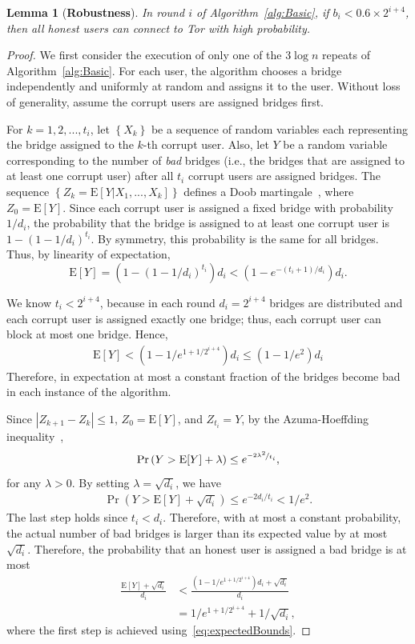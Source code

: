 \documentclass[letterpaper,twocolumn,10pt]{article}
\newcommand{\ie}{i.e.}
\newcommand{\E}{\mathbf{\mathrm{E}}}
\newtheorem{lemma}{Lemma}
\newcommand{\sfsize}{\fontsize{0.73\baselineskip}{0.73\baselineskip}\selectfont}
\newcommand{\sans}[1]{\textsf{\sfsize \mbox{#1}}}
\newcommand{\sansb}[1]{\textbf{\sans{\mbox{#1}}}}
\begin{document}
\begin{lemma}[\sansb{Robustness}] \label{lem:robustness}
	In round $i$ of Algorithm~\ref{alg:Basic}, if ${b_i < 0.6 \times 2^{i+4}}$, then all honest users can connect to Tor with high probability.
\end{lemma}
\begin{proof}
	We first consider the execution of only one of the $3\log{n}$ repeats of Algorithm~\ref{alg:Basic}. For each user, the algorithm chooses a bridge independently and uniformly at random and assigns it to the user. Without loss of generality, assume the corrupt users are assigned bridges first.
	
	For ${k=1,2,...,t_i}$, let $\left\{X_k\right\}$ be a sequence of random variables each representing the bridge assigned to the $k$-th corrupt user. Also, let $Y$ be a random variable corresponding to the number of \emph{bad} bridges (\ie, the bridges that are assigned to at least one corrupt user) after all $t_i$ corrupt users are assigned bridges. The sequence ${\left\{Z_k = \E[Y|X_1,...,X_k]\right\}}$ defines a Doob martingale~\cite[Chapter~5]{dubhashi:2009}, where ${Z_0 = \E[Y]}$. 
	Since each corrupt user is assigned a fixed bridge with probability $1/d_i$, the probability that the bridge is assigned to at least one corrupt user is ${1-(1-1/d_i)^{t_i}}$. By symmetry, this probability is the same for all bridges. Thus, by linearity of expectation,
	\[\E[Y] = \left(1 - \left(1-1/d_i\right)^{t_i}\right)d_i < (1 - e^{-(t_i+1)/d_i})d_i.\]
	
	We know ${t_i < 2^{i+4}}$, because in each round ${d_i = 2^{i+4}}$ bridges are distributed and each corrupt user is assigned exactly one bridge; thus, each corrupt user can block at most one bridge. Hence, 
	\begin{align}
	\E[Y] < (1 - 1/e^{1+1/2^{i+4}})d_i \leq (1 - 1/e^2)d_i \label{eq:expectedBounds}
	\end{align}
	Therefore, in expectation at most a constant fraction of the bridges become bad in each instance of the algorithm. 
	
	Since ${|Z_{k+1} - Z_k| \leq 1}$, ${Z_0 = \E[Y]}$, and ${Z_{t_i} = Y}$, by the Azuma-Hoeffding inequality~\cite[Theorem 5.2]{dubhashi:2009},
	\[\Pr\left(Y > \E[Y] + \lambda\right) \leq e^{\nicefrac{-2\lambda^2}{t_i}},\]
	for any ${\lambda > 0}$. 
	By setting ${\lambda = \sqrt{d_i}}$, we have
	\begin{align}
	\Pr(Y > \E[Y] + \sqrt{d_i}) \leq e^{-2d_i/t_i} < 1/e^2. \label{eq:p1}
	\end{align}
	The last step holds since ${t_i < d_i}$. Therefore, with at most a constant probability, the actual number of bad bridges is larger than its expected value by at most $\sqrt{d_i}$. Therefore, the probability that an honest user is assigned a bad bridge is at most
	\begin{align}
	\frac{\E[Y] + \sqrt{d_i}}{d_i} &< \frac{(1-1/e^{1+1/2^{i+4}})d_i + \sqrt{d_i}}{d_i} \nonumber \\ &= 1/e^{1+1/2^{i+4}} + 1/\sqrt{d_i}, \label{eq:p2}
	\end{align}
	where the first step is achieved using~\eqref{eq:expectedBounds}.
	

\end{proof}
\end{document}
